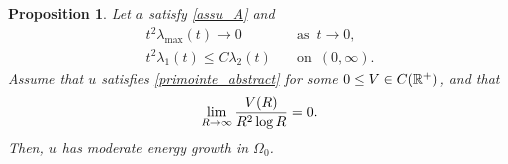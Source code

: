 \documentclass[10 pt,a4paper]{article}
\newtheorem{proposition}[definition]{Proposition}
\theoremstyle{definition}
\begin{document}
\begin{proposition}\label{prop_volume_MC}    %
	Let $a$ satisfy \eqref{assu_A} and 
	\begin{equation}\label{eq_ass_lambda}
	\begin{array}{ll}
	t^2 \lambda_{\max}(t) \to 0 & \quad \text{as } \, t \to 0, \\[0.3cm]
	t^2 \lambda_1(t) \le C \lambda_2(t) & \quad \text{on } \, (0, \infty).
	\end{array}
	\end{equation}
	Assume that $u$ satisfies \eqref{primointe_abstract} for some $0 \le V \in C(\mathbb R^+)$, and that
	\begin{equation}\label{crescivol}
		\lim_{R \rightarrow \infty} \frac{V(R)}{R^2 \log R}=0. 
	\end{equation}
	Then, $u$ has moderate energy growth in $\Omega_0$.
\end{proposition}
\end{document}
